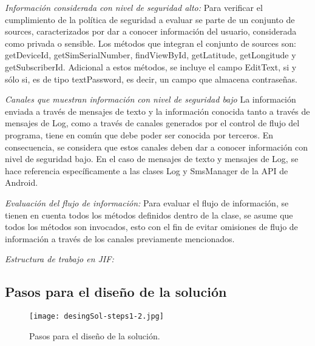 \textit{Información considerada con nivel de seguridad alto:}\newline
Para verificar el cumplimiento de la política de seguridad a evaluar se parte de
un conjunto de sources, caracterizados por dar a conocer información del
usuario, considerada como privada o sensible. Los métodos que integran el
conjunto de sources son: getDeviceId, getSimSerialNumber, findViewById,
getLatitude, getLongitude y getSubscriberId. Adicional a estos métodos, se
incluye el campo EditText, si y sólo si, es de tipo textPassword, es decir, un
campo que almacena contraseñas.

\textit{Canales que muestran información con nivel de seguridad bajo}\newline
La información enviada a través de mensajes de texto y la información conocida
tanto a través de mensajes de Log, como a través de canales generados por el
control de flujo del programa, tiene en común que debe poder ser conocida por
terceros. En consecuencia, se considera que estos canales deben dar a conocer
información con nivel de seguridad bajo.\newline
En el caso de mensajes de texto y mensajes de Log, se hace referencia
específicamente a las clases Log y SmsManager de la API de Android.

\textit{Evaluación del flujo de información:}\newline
Para evaluar el flujo de información, se tienen en cuenta todos los métodos
definidos dentro de la clase, se asume que todos los métodos son invocados, esto
con el fin de evitar omisiones de flujo de información a través de los canales
previamente mencionados.

\textit{Estructura de trabajo en JIF:}\newline


\subsection{Pasos para el diseño de la solución}

\begin{figure}[h!]
	\begin{center}
	\texttt{[image: desingSol-steps1-2.jpg]}
	\end{center}
	\caption{Pasos para el diseño de la solución.}
	\label{fig:desingSol-steps1-2}
\end{figure}

